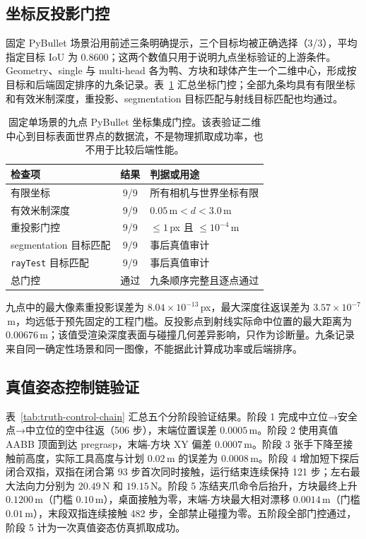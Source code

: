 \documentclass{l4proj}
\begin{document}
\subsection{坐标反投影门控}
固定 PyBullet 场景沿用前述三条明确提示，三个目标均被正确选择（3/3），平均指定目标 IoU 为 0.8600；这两个数值只用于说明九点坐标验证的上游条件。Geometry、single 与 multi-head 各为鸭、方块和球体产生一个二维中心，形成按目标和后端固定排序的九条记录。表~\ref{tab:pybullet-backprojection} 汇总坐标门控；全部九条均具有有限坐标和有效米制深度，重投影、segmentation 目标匹配与射线目标匹配也均通过。

\begin{table}[htbp]
  \centering
  \caption{固定单场景的九点 PyBullet 坐标集成门控。该表验证二维中心到目标表面世界点的数据流，不是物理抓取成功率，也不用于比较后端性能。}
  \label{tab:pybullet-backprojection}
  \begin{tabular}{lcl}
    \toprule
    检查项 & 结果 & 判据或用途 \\
    \midrule
    有限坐标 & 9/9 & 所有相机与世界坐标有限 \\
    有效米制深度 & 9/9 & $0.05\,\mathrm{m}<d<3.0\,\mathrm{m}$ \\
    重投影门控 & 9/9 & $\leq1$\,px 且 $\leq10^{-4}$\,m \\
    segmentation 目标匹配 & 9/9 & 事后真值审计 \\
    \texttt{rayTest} 目标匹配 & 9/9 & 事后真值审计 \\
    总门控 & 通过 & 九条顺序完整且逐点通过 \\
    \bottomrule
  \end{tabular}
\end{table}

九点中的最大像素重投影误差为 $8.04\times10^{-13}$\,px，最大深度往返误差为 $3.57\times10^{-7}$\,m，均远低于预先固定的工程门槛。反投影点到射线实际命中位置的最大距离为 $0.00676$\,m；该值受渲染深度表面与碰撞几何差异影响，只作为诊断量。九条记录来自同一确定性场景和同一图像，不能据此计算成功率或后端排序。

\subsection{真值姿态控制链验证}
表~\ref{tab:truth-control-chain} 汇总五个分阶段验证结果。阶段 1 完成中立位→安全点→中立位的空中往返（506 步），末端位置误差 $0.0005$\,m。阶段 2 使用真值 AABB 顶面到达 pregrasp，末端-方块 XY 偏差 $0.0007$\,m。阶段 3 张手下降至接触前高度，实际工具高度与计划 $0.02$\,m 的误差为 $0.0008$\,m。阶段 4 增加短下探后闭合双指，双指在闭合第 93 步首次同时接触，运行结束连续保持 121 步；左右最大法向力分别为 $20.49$\,N 和 $19.15$\,N。阶段 5 冻结夹爪命令后抬升，方块最终上升 $0.1200$\,m（门槛 $0.10$\,m），桌面接触为零，末端-方块最大相对漂移 $0.0014$\,m（门槛 $0.01$\,m），末段双指连续接触 482 步，全部禁止碰撞为零。五阶段全部门控通过，阶段 5 计为一次真值姿态仿真抓取成功。
\end{document}
